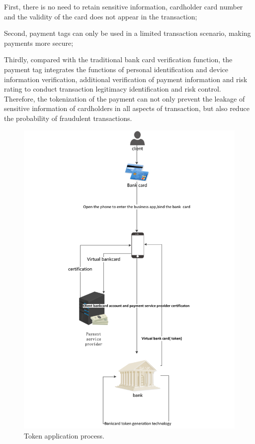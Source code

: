 \documentclass[journal]{IEEEtran}
\begin{document}
First, there is no need to retain sensitive information, cardholder card number and the validity of the card does not appear in the transaction;

Second, payment tags can only be used in a limited transaction scenario, making payments more secure;

Thirdly, compared with the traditional bank card verification function, the payment tag integrates the functions of personal identification and device information verification, additional verification of payment information and risk rating to conduct transaction legitimacy identification and risk control. Therefore, the tokenization of the payment can not only prevent the leakage of sensitive information of cardholders in all aspects of transaction, but also reduce the probability of fraudulent transactions.

\begin{figure}[htbp]
\centerline{\includegraphics[scale=0.7]{token_shengcheng.pdf}}
\caption{Token application process.}
\label{fig}
\end{figure}
\end{document}
